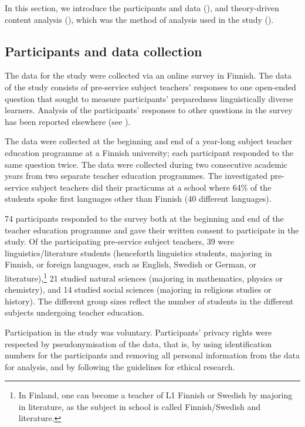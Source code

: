\documentclass[output=paper]{langscibook}
\begin{document}
In this section, we introduce the participants and data (), and theory-driven content analysis (\citealt{Krippendorf2012, Tuomi2018-1}), which was the method of analysis used in the study ().

\subsection{Participants and data collection}\label{sec:heikkola:4.1}

The data for the study were collected via an online survey in Finnish.\textbf{ }The data of the study consists of pre-service subject teachers’ responses to one open-ended question that sought to measure participants’ preparedness  linguistically diverse learners. Analysis of the participants’ responses to other questions in the survey has been reported elsewhere (see \citealt{HeikkolaEtAl2022}).

The data were collected at the beginning and end of a year-long subject teacher education programme at a Finnish university; each participant responded to the same question twice. The data were collected during two consecutive academic years from two separate teacher education programmes. The investigated pre-service subject teachers did their practicums at a school where 64\% of the students spoke first languages other than Finnish (40 different languages).

74 participants responded to the survey both at the beginning and end of the teacher education programme and gave their written consent to participate in the study. Of the participating pre-service subject teachers, 39 were linguistics/literature students (henceforth linguistics students, majoring in Finnish, or foreign languages, such as English, Swedish or German, or literature),\footnote{In Finland, one can become a teacher of L1 Finnish or Swedish by majoring in literature, as the subject in school is called Finnish/Swedish and literature.} 21 studied natural sciences (majoring in mathematics, physics or chemistry), and 14 studied social sciences (majoring in religious studies or history). The different group sizes reflect the number of students in the different subjects undergoing teacher education. 

Participation in the study was voluntary. Participants’ privacy rights were respected by pseudonymisation of the data, that is, by using identification numbers for the participants and removing all personal information from the data for analysis, and by following the guidelines for ethical research. 
\end{document}
